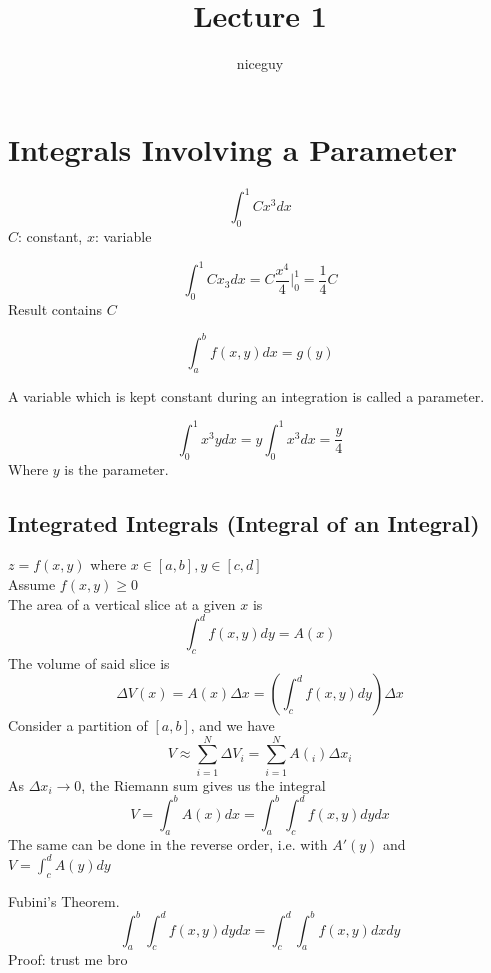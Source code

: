 \documentclass[12pt]{article}
\title{Lecture 1}
\author{niceguy}
\begin{document}
\maketitle
\section{Integrals Involving a Parameter}

\begin{ex}
 $$\int_0^1 Cx^3 dx$$
 $C$: constant, $x$: variable
\end{ex}

\begin{ex}
$$ \int_0^1 Cx_3 dx = C\frac{x^4}{4}\Big |_0^1 = \frac{1}{4}C$$
Result contains $C$
\end{ex}

\begin{ex}
 $$\int_a^b f(x,y)dx = g(y)$$
\end{ex}

\begin{defn}
 A variable which is kept constant during an integration is called a parameter.
\end{defn}

\begin{ex}
 $$\int_0^1 x^3ydx = y\int_0^1 x^3 dx = \frac{y}{4}$$
 Where $y$ is the parameter.
\end{ex}

\subsection{Integrated Integrals (Integral of an Integral)}

$z = f(x,y)$ where $x \in [a,b], y \in [c,d]$ \\
Assume $f(x,y) \geq 0$ \\
The area of a vertical slice at a given $x$ is
$$\int_c^d f(x,y)dy = A(x)$$
The volume of said slice is
$$\Delta V(x) = A(x) \Delta x = \left( \int_c^d f(x,y)dy \right) \Delta x$$
Consider a partition of $[a,b]$, and we have
$$V \approx \sum_{i=1}^N \Delta V_i = \sum_{i=1}^N A(_i)\Delta x_i$$
As $\Delta x_i \rightarrow 0$, the Riemann sum gives us the integral
$$V = \int_a^b A(x)dx = \int_a^b \int_c^d f(x,y)dydx$$
The same can be done in the reverse order, i.e. with $A'(y)$ and $V = \int_c^d A(y) dy$

\begin{thm}
 Fubini's Theorem. \\
 $$\int_a^b \int_c^d f(x,y)dydx = \int_c^d \int_a^b f(x,y) dxdy$$
 Proof: trust me bro
\end{thm}
\end{document}

